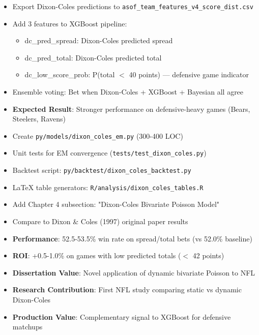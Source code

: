 \begin{itemize}
  \item {} Export Dixon-Coles predictions to \texttt{asof\_team\_features\_v4\_score\_dist.csv}
  \item {} Add 3 features to XGBoost pipeline:
  \begin{itemize}
    \item dc\_pred\_spread: Dixon-Coles predicted spread
    \item dc\_pred\_total: Dixon-Coles predicted total
    \item dc\_low\_score\_prob: P(total $<$ 40 points) — defensive game indicator
  \end{itemize}
  \item {} Ensemble voting: Bet when Dixon-Coles + XGBoost + Bayesian all agree
  \item \textbf{Expected Result}: Stronger performance on defensive-heavy games (Bears, Steelers, Ravens)
\end{itemize}

\begin{itemize}
  \item {} Create \texttt{py/models/dixon\_coles\_em.py} (300-400 LOC)
  \item {} Unit tests for EM convergence (\texttt{tests/test\_dixon\_coles.py})
  \item {} Backtest script: \texttt{py/backtest/dixon\_coles\_backtest.py}
  \item {} LaTeX table generators: \texttt{R/analysis/dixon\_coles\_tables.R}
  \item {} Add Chapter 4 subsection: "Dixon-Coles Bivariate Poisson Model"
  \item {} Compare to Dixon \& Coles (1997) original paper results
\end{itemize}

\begin{itemize}
  \item \textbf{Performance}: 52.5-53.5\% win rate on spread/total bets (vs 52.0\% baseline)
  \item \textbf{ROI}: +0.5-1.0\% on games with low predicted totals ($<$ 42 points)
  \item \textbf{Dissertation Value}: Novel application of dynamic bivariate Poisson to NFL
  \item \textbf{Research Contribution}: First NFL study comparing static vs dynamic Dixon-Coles
  \item \textbf{Production Value}: Complementary signal to XGBoost for defensive matchups
\end{itemize}

